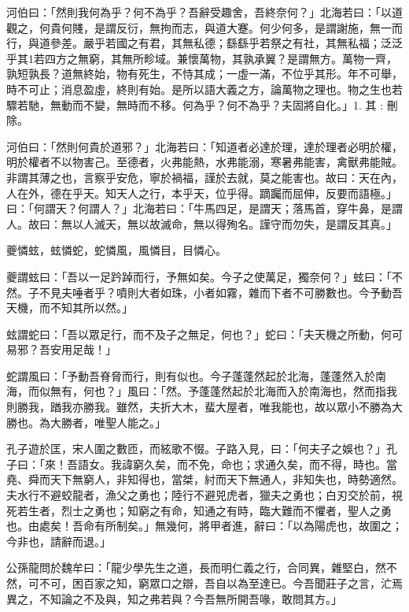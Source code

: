 \begin{pinyinscope}
河伯曰：「然則我何為乎？何不為乎？吾辭受趣舍，吾終奈何？」北海若曰：「以道觀之，何貴何賤，是謂反衍，無拘而志，與道大蹇。何少何多，是謂謝施，無一而行，與道參差。嚴乎若國之有君，其無私德；繇繇乎若祭之有社，其無私福；泛泛乎其1若四方之無窮，其無所畛域。兼懷萬物，其孰承翼？是謂無方。萬物一齊，孰短孰長？道無終始，物有死生，不恃其成；一虛一滿，不位乎其形。年不可舉，時不可止；消息盈虛，終則有始。是所以語大義之方，論萬物之理也。物之生也若驟若馳，無動而不變，無時而不移。何為乎？何不為乎？夫固將自化。」1. 其 : 刪除。

河伯曰：「然則何貴於道邪？」北海若曰：「知道者必達於理，達於理者必明於權，明於權者不以物害己。至德者，火弗能熱，水弗能溺，寒暑弗能害，禽獸弗能賊。非謂其薄之也，言察乎安危，寧於禍福，謹於去就，莫之能害也。故曰：天在內，人在外，德在乎天。知天人之行，本乎天，位乎得。蹢䠱而屈伸，反要而語極。」曰：「何謂天？何謂人？」北海若曰：「牛馬四足，是謂天；落馬首，穿牛鼻，是謂人。故曰：無以人滅天，無以故滅命，無以得殉名。謹守而勿失，是謂反其真。」

夔憐蚿，蚿憐蛇，蛇憐風，風憐目，目憐心。

夔謂蚿曰：「吾以一足趻踔而行，予無如矣。今子之使萬足，獨奈何？」蚿曰：「不然。子不見夫唾者乎？噴則大者如珠，小者如霧，雜而下者不可勝數也。今予動吾天機，而不知其所以然。」

蚿謂蛇曰：「吾以眾足行，而不及子之無足，何也？」蛇曰：「夫天機之所動，何可易邪？吾安用足哉！」

蛇謂風曰：「予動吾脊脅而行，則有似也。今子蓬蓬然起於北海，蓬蓬然入於南海，而似無有，何也？」風曰：「然。予蓬蓬然起於北海而入於南海也，然而指我則勝我，䠓我亦勝我。雖然，夫折大木，蜚大屋者，唯我能也，故以眾小不勝為大勝也。為大勝者，唯聖人能之。」

孔子遊於匡，宋人圍之數匝，而絃歌不惙。子路入見，曰：「何夫子之娛也？」孔子曰：「來！吾語女。我諱窮久矣，而不免，命也；求通久矣，而不得，時也。當堯、舜而天下無窮人，非知得也，當桀，紂而天下無通人，非知失也，時勢適然。夫水行不避蛟龍者，漁父之勇也；陸行不避兕虎者，獵夫之勇也；白刃交於前，視死若生者，烈士之勇也；知窮之有命，知通之有時，臨大難而不懼者，聖人之勇也。由處矣！吾命有所制矣。」無幾何，將甲者進，辭曰：「以為陽虎也，故圍之；今非也，請辭而退。」

公孫龍問於魏牟曰：「龍少學先生之道，長而明仁義之行，合同異，雜堅白，然不然，可不可，困百家之知，窮眾口之辯，吾自以為至達已。今吾聞莊子之言，汒焉異之，不知論之不及與，知之弗若與？今吾無所開吾喙，敢問其方。」


\end{pinyinscope}
